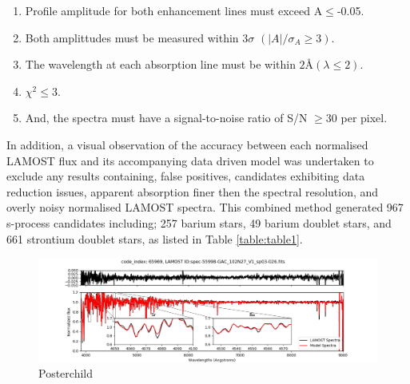 \documentclass[a4paper,fleqn,usenatbib]{mnras}
\begin{document}
\begin{enumerate} 
\item Profile amplitude for both enhancement lines must exceed A$\leq$-0.05.
\item Both amplittudes must be measured within 3$\sigma$ $(|A|/\sigma _A \geq 3)$.
\item The wavelength at each absorption line must be within $2$\AA \hspace{0.2mm}$(\lambda \leq 2)$.
\item $\chi^2 \leq 3$.
\item And, the spectra must have a signal-to-noise ratio of S/N $\geq 30$ per pixel.
\end{enumerate}
In addition, a visual observation of the accuracy between each normalised LAMOST flux and its accompanying data driven model was undertaken to exclude any results containing, false positives, candidates exhibiting data reduction issues, apparent absorption finer then the spectral resolution, and overly noisy normalised LAMOST spectra. This combined method generated 967 s-process candidates including; 257 barium stars, 49 barium doublet stars, and 661 strontium doublet stars, as listed in Table \ref{table:table1}. 

\begin{figure}
	\includegraphics[width=\columnwidth]{posterchild.png}
    \caption{Posterchild}
    \label{fig:figure1}
\end{figure}
\end{document}
